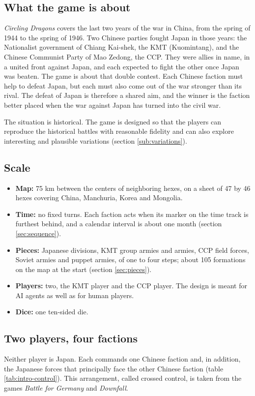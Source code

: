 \documentclass[11pt]{article}
\begin{document}
\subsection{What the game is about}
\emph{Circling Dragons} covers the last two years of the war in China, from the spring of 1944 to the spring of 1946. Two Chinese parties fought Japan in those years: the Nationalist government of Chiang Kai-shek, the KMT (Kuomintang), and the Chinese Communist Party of Mao Zedong, the CCP. They were allies in name, in a united front against Japan, and each expected to fight the other once Japan was beaten. The game is about that double contest. Each Chinese faction must help to defeat Japan, but each must also come out of the war stronger than its rival. The defeat of Japan is therefore a shared aim, and the winner is the faction better placed when the war against Japan has turned into the civil war.

The situation is historical. The game is designed so that the players can reproduce the historical battles with reasonable fidelity and can also explore interesting and plausible variations (section \ref{sub:variations}).

\subsection{Scale}
\begin{itemize}
\item \textbf{Map:} 75 km between the centers of neighboring hexes, on a sheet of 47 by 46 hexes covering China, Manchuria, Korea and Mongolia.
\item \textbf{Time:} no fixed turns. Each faction acts when its marker on the time track is furthest behind, and a calendar interval is about one month (section \ref{sec:sequence}).
\item \textbf{Pieces:} Japanese divisions, KMT group armies and armies, CCP field forces, Soviet armies and puppet armies, of one to four steps; about 105 formations on the map at the start (section \ref{sec:pieces}).
\item \textbf{Players:} two, the KMT player and the CCP player. The design is meant for AI agents as well as for human players.
\item \textbf{Dice:} one ten-sided die.
\end{itemize}

\subsection{Two players, four factions}\label{sub:intro-control}
Neither player is Japan. Each commands one Chinese faction and, in addition, the Japanese forces that principally face the other Chinese faction (table \ref{tab:intro-control}). This arrangement, called crossed control, is taken from the games \emph{Battle for Germany} and \emph{Downfall}.
\end{document}
